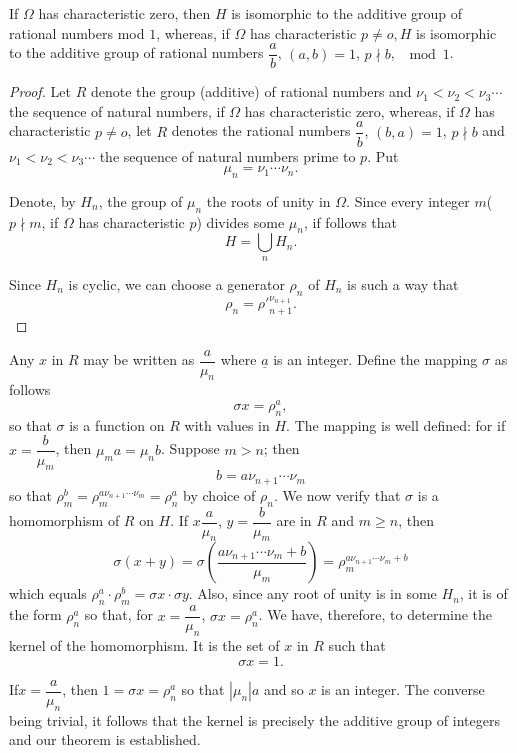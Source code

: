 \setcounter{thm}{0}
\begin{thm}\label{c6:thm1}%
If $\Omega$ has characteristic zero, then $H$ is isomorphic to the
 additive group of rational numbers mod $1$, whereas, if $\Omega$ has
  characteristic $p \neq o, H$ is isomorphic to the additive group of
  rational numbers $\dfrac{a}{b}$, $(a,b) = 1$, $p \nmid b$, $\mod 1$. 
\end{thm} 

\begin{proof}%
Let $R$ denote the group (additive) of rational numbers and $\nu_1 < 
\nu_2 < \nu_3 \cdots$ the sequence of natural numbers, if $\Omega$ has
characteristic zero, whereas, if $\Omega$ has characteristic $p \neq
o$, let $R$ denotes the rational numbers $\dfrac{a}{b}$, $(b,a) = 1$, $p
\nmid b$ and $\nu_1 < \nu_2 < \nu_3 \cdots$ the sequence of natural numbers
prime to $p$. Put 
$$
\mu_n = \nu_1 \cdots \nu_n.
$$\pageoriginale

Denote, by $H_n$, the group of $\mu_n$ the roots of unity in
$\Omega$. Since every integer $m$($p \nmid m$, if $\Omega$ has
characteristic $p$) divides some $\mu_n$, if follows that   
$$
H = \bigcup_n H_n.
$$

Since $H_n$ is cyclic, we can choose a generator $\rho_n$ of $H_n$ is
such a way that   
$$
\rho_n = {\rho'}^{\nu_{n+1}}_{n+1}.
$$
\end{proof}

Any $x$ in $R$ may be written as $\dfrac{a}{\mu_n}$ where $\underline{a}$
is an integer. Define the mapping $\sigma $ as follows  
$$
\sigma x = \rho^a_n,
$$
so that $\sigma$ is a function on $R$ with values in $H$. The mapping
is well defined: for if $x = \dfrac{b}{\mu_m}$, then $ \mu_m a = \mu_n
b$. Suppose $m > n$; then 
$$
b = a \nu_{n+1} \cdots \nu_m
$$
so that $\rho^b_m = \rho^{a \nu_{n+1} \cdots \nu_m}_m = \rho^a_n$ by choice
of $\rho_n$. We now verify that $\sigma$ is a homomorphism of $R$ on
$H$. If $x \dfrac{a}{\mu_n}$, $y = \dfrac{b}{\mu_m}$ are in $R$ and $m
\ge n$, then 
$$
\sigma (x+y) = \sigma (\frac{a \nu_{n+1} \cdots \nu_m +b}{\mu_m}) = \rho_m
^{a \nu_{n+1} \cdots \nu_m + b} 
$$
which equals $\rho^a_n \cdot \rho^b_m = \sigma x \cdot \sigma y$. Also, since
any root of unity is in some $H_n$, it is of the form $\rho^a_n$ so
that, for $x= \dfrac{a}{\mu_n}$, $\sigma x = \rho^a_n$. We have,
therefore, to determine the kernel of the homomorphism. It is the set
of $x$ in $R$ such that 
$$
\sigma x = 1.
$$  

If\pageoriginale $x = \dfrac{a}{\mu_n}$, then $1 = \sigma x =
\rho^a_n$ so that 
$|\mu_n|a$ and so $x$ is an integer. The converse being trivial, it
follows that the kernel is precisely the additive group of integers
and our theorem is established. 

